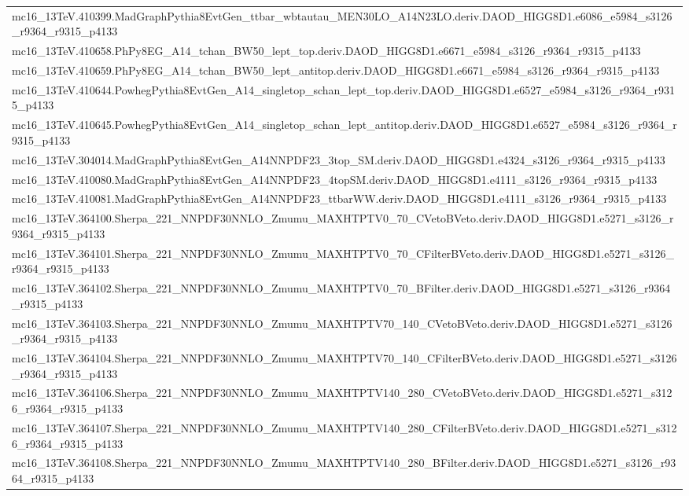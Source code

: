 \begin{adjustwidth}{-3em}{-3em}
\begin{longtable}{l}
mc16\_13TeV.410399.MadGraphPythia8EvtGen\_ttbar\_wbtautau\_MEN30LO\_A14N23LO.deriv.DAOD\_HIGG8D1.e6086\_e5984\_s3126\_r9364\_r9315\_p4133 \\
mc16\_13TeV.410658.PhPy8EG\_A14\_tchan\_BW50\_lept\_top.deriv.DAOD\_HIGG8D1.e6671\_e5984\_s3126\_r9364\_r9315\_p4133 \\
mc16\_13TeV.410659.PhPy8EG\_A14\_tchan\_BW50\_lept\_antitop.deriv.DAOD\_HIGG8D1.e6671\_e5984\_s3126\_r9364\_r9315\_p4133 \\
mc16\_13TeV.410644.PowhegPythia8EvtGen\_A14\_singletop\_schan\_lept\_top.deriv.DAOD\_HIGG8D1.e6527\_e5984\_s3126\_r9364\_r9315\_p4133 \\
mc16\_13TeV.410645.PowhegPythia8EvtGen\_A14\_singletop\_schan\_lept\_antitop.deriv.DAOD\_HIGG8D1.e6527\_e5984\_s3126\_r9364\_r9315\_p4133 \\
mc16\_13TeV.304014.MadGraphPythia8EvtGen\_A14NNPDF23\_3top\_SM.deriv.DAOD\_HIGG8D1.e4324\_s3126\_r9364\_r9315\_p4133 \\
mc16\_13TeV.410080.MadGraphPythia8EvtGen\_A14NNPDF23\_4topSM.deriv.DAOD\_HIGG8D1.e4111\_s3126\_r9364\_r9315\_p4133 \\
mc16\_13TeV.410081.MadGraphPythia8EvtGen\_A14NNPDF23\_ttbarWW.deriv.DAOD\_HIGG8D1.e4111\_s3126\_r9364\_r9315\_p4133 \\
mc16\_13TeV.364100.Sherpa\_221\_NNPDF30NNLO\_Zmumu\_MAXHTPTV0\_70\_CVetoBVeto.deriv.DAOD\_HIGG8D1.e5271\_s3126\_r9364\_r9315\_p4133 \\
mc16\_13TeV.364101.Sherpa\_221\_NNPDF30NNLO\_Zmumu\_MAXHTPTV0\_70\_CFilterBVeto.deriv.DAOD\_HIGG8D1.e5271\_s3126\_r9364\_r9315\_p4133 \\
mc16\_13TeV.364102.Sherpa\_221\_NNPDF30NNLO\_Zmumu\_MAXHTPTV0\_70\_BFilter.deriv.DAOD\_HIGG8D1.e5271\_s3126\_r9364\_r9315\_p4133 \\
mc16\_13TeV.364103.Sherpa\_221\_NNPDF30NNLO\_Zmumu\_MAXHTPTV70\_140\_CVetoBVeto.deriv.DAOD\_HIGG8D1.e5271\_s3126\_r9364\_r9315\_p4133 \\
mc16\_13TeV.364104.Sherpa\_221\_NNPDF30NNLO\_Zmumu\_MAXHTPTV70\_140\_CFilterBVeto.deriv.DAOD\_HIGG8D1.e5271\_s3126\_r9364\_r9315\_p4133 \\
mc16\_13TeV.364106.Sherpa\_221\_NNPDF30NNLO\_Zmumu\_MAXHTPTV140\_280\_CVetoBVeto.deriv.DAOD\_HIGG8D1.e5271\_s3126\_r9364\_r9315\_p4133 \\
mc16\_13TeV.364107.Sherpa\_221\_NNPDF30NNLO\_Zmumu\_MAXHTPTV140\_280\_CFilterBVeto.deriv.DAOD\_HIGG8D1.e5271\_s3126\_r9364\_r9315\_p4133 \\
mc16\_13TeV.364108.Sherpa\_221\_NNPDF30NNLO\_Zmumu\_MAXHTPTV140\_280\_BFilter.deriv.DAOD\_HIGG8D1.e5271\_s3126\_r9364\_r9315\_p4133 \\

\end{longtable}
\end{adjustwidth}
